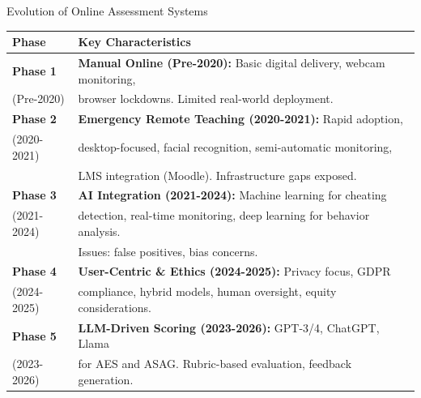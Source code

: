\begin{frame}{Evolution of Online Assessment Systems}
    \begin{table}[]
        \centering
        \small
        \begin{tabular}{l p{8cm}}
            \toprule
            \textbf{Phase} & \textbf{Key Characteristics} \\
            \midrule
            \textbf{Phase 1} & \textbf{Manual Online (Pre-2020):} Basic digital delivery, webcam monitoring, \\
            (Pre-2020) & browser lockdowns. Limited real-world deployment. \\
            \midrule
            \textbf{Phase 2} & \textbf{Emergency Remote Teaching (2020-2021):} Rapid adoption, \\
            (2020-2021) & desktop-focused, facial recognition, semi-automatic monitoring, \\
            & LMS integration (Moodle). Infrastructure gaps exposed. \\
            \midrule
            \textbf{Phase 3} & \textbf{AI Integration (2021-2024):} Machine learning for cheating \\
            (2021-2024) & detection, real-time monitoring, deep learning for behavior analysis. \\
            & Issues: false positives, bias concerns. \\
            \midrule
            \textbf{Phase 4} & \textbf{User-Centric \& Ethics (2024-2025):} Privacy focus, GDPR \\
            (2024-2025) & compliance, hybrid models, human oversight, equity considerations. \\
            \midrule
            \textbf{Phase 5} & \textbf{LLM-Driven Scoring (2023-2026):} GPT-3/4, ChatGPT, Llama \\
            (2023-2026) & for AES and ASAG. Rubric-based evaluation, feedback generation. \\
            \bottomrule
        \end{tabular}
    \end{table}
\end{frame}

